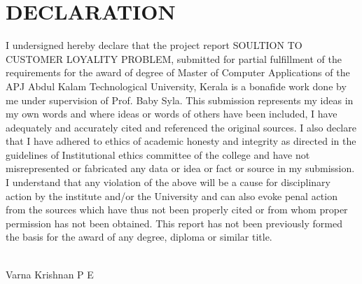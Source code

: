 \chapter*{\rm \large \bf DECLARATION}
\vspace{4.0mm}
\setlength{\parindent}{6em}
I undersigned hereby declare that the project report
SOULTION TO CUSTOMER LOYALITY PROBLEM, submitted for partial
fulfillment of the requirements for the award of degree of Master of Computer Applications
of the APJ Abdul Kalam Technological University, Kerala is a bonafide work done
by me under supervision of Prof. Baby Syla. This submission represents my
ideas in my own words and where ideas or words of others have been included, I
have adequately and accurately cited and referenced the original sources. I also
declare that I have adhered to ethics of academic honesty and integrity as directed in the guidelines of Institutional ethics committee of the college and have not misrepresented or fabricated any data or idea or fact or source in my
submission. I understand that any violation of the above will be a cause for
disciplinary action by the institute and/or the University and can also evoke
penal action from the sources which have thus not been properly cited or from
whom proper permission has not been obtained. This report has not been
previously formed the basis for the award of any degree, diploma or similar
title.

\vspace{0.3 cm}

\\
\hfill {Varna Krishnan P E}\\

\newpage 
